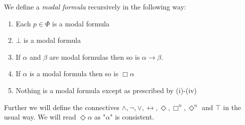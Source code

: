 \documentclass[../main.tex]{subfiles}
\begin{document}
\begin{defi}
	We define a \textit{modal formula} recursively in the following way:
	\begin{enumerate}[label=\roman*]
		\item Each $p\in\Phi$ is a modal formula
		\item $\bot$ is a modal formula
		\item If $\alpha$ and $\beta$ are modal formulas then so is
			$\alpha\rightarrow\beta$.
		\item If $\alpha$ is a modal formula then so is $\Box\alpha$
		\item Nothing is a modal formula except as prescribed by
			(i)-(iv)
	\end{enumerate}
\end{defi}
Further we will define the connectives $\wedge,\neg,\vee,\leftrightarrow,
\Diamond, \Box^n,\Diamond^n$ and $\top$
in the usual way. We will read $\Diamond \alpha$ as "$\alpha$" is consistent.
\end{document}
